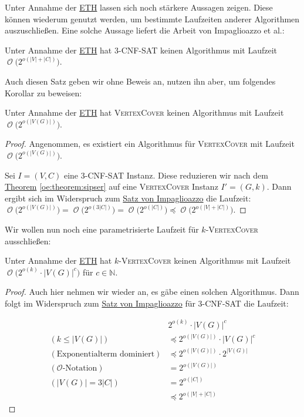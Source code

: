 \documentclass[a4paper,ngerman]{atseminar}
\newcommand{\N}{\ensuremath{\mathbb{N}}\xspace}
\newcommand{\BigO}[1]{\ensuremath{\operatorname{\mathcal{O}}\bigl(#1\bigr)}\xspace}
\begin{document}
\noindent
Unter Annahme der \hyperref[oe:definition:eth]{ETH} lassen sich noch stärkere Aussagen zeigen.
Diese können wiederum genutzt werden, um bestimmte Laufzeiten anderer Algorithmen auszuschließen.
Eine solche Aussage liefert die Arbeit von Impaglioazzo et al.:

\begin{theorem}
  \label{oe:theorem:impaglioazzo}
  Unter Annahme der \hyperref[oe:definition:eth]{ETH} hat 3-\textsc{CNF-SAT} keinen Algorithmus mit Laufzeit $\BigO{2^{o(|V|+|C|)}}$.
\end{theorem}
\noindent
Auch diesen Satz geben wir ohne Beweis an, nutzen ihn aber, um folgendes Korollar zu beweisen:

\begin{corollary}
  Unter Annahme der \hyperref[oe:definition:eth]{ETH} hat \textsc{VertexCover} keinen Algorithmus mit Laufzeit \BigO{2^{o(|V(G)|)}}.
\end{corollary}
\begin{proof}
  Angenommen, es existiert ein Algorithmus für \textsc{VertexCover} mit Laufzeit \BigO{2^{o(|V(G)|)}}.
  
  \noindent
  Sei $I = (V, C)$ eine 3-\textsc{CNF-SAT} Instanz. Diese reduzieren wir nach dem \hyperref[oe:theorem:sipser]{Theorem} \ref{oe:theorem:sipser} auf eine
  \textsc{VertexCover} Instanz $I' = (G, k)$.
  Dann ergibt sich im Widerspruch zum \hyperref[oe:theorem:impaglioazzo]{Satz von Impaglioazzo} die Laufzeit:
  $\BigO{2^{o(|V(G)|)}} = \BigO{2^{o(3|C|)}} = \BigO{2^{o(|C|)}} \preceq \BigO{2^{o(|V| + |C|)}}$.
\end{proof}

\noindent
Wir wollen nun noch eine parametrisierte Laufzeit für $k$-\textsc{VertexCover} ausschließen:

\begin{corollary}
  Unter Annahme der \hyperref[oe:definition:eth]{ETH} hat $k$-\textsc{VertexCover} keinen Algorithmus mit Laufzeit \BigO{2^{o(k)} \cdot |V(G)|^{c}} für $c \in \N$.
\end{corollary}
\begin{proof}
  Auch hier nehmen wir wieder an, es gäbe einen solchen Algorithmus.
  Dann folgt im Widerspruch zum \hyperref[oe:theorem:impaglioazzo]{Satz von Impaglioazzo} für 3-\textsc{CNF-SAT} die Laufzeit:

  \begin{equation*}
    \begin{split}
      & 2^{o(k)} \cdot |V(G)|^{c} \\
    (k \leq |V(G)|) & \preceq 2^{o(|V(G)|)} \cdot |V(G)|^{c} \\
    (\text{Exponentialterm dominiert}) & \preceq 2^{o(|V(G)|)} \cdot 2^{|V(G)|} \\
    (\mathcal{O}\text{-Notation})& = 2^{o(|V(G)|)} \\
    (|V(G)| = 3|C|)& = 2^{o(|C|)} \\
    & \preceq 2^{o(|V| + |C|)}
    \end{split}
  \end{equation*}
\end{proof}
\end{document}
